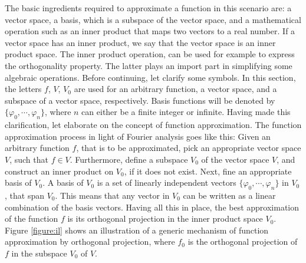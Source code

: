 \documentclass[../Main/thesis.tex]{subfiles}
\begin{document}
The basic ingredients required to approximate a function in this scenario are: a vector space, a basis, which is a subspace of the vector space, and a mathematical operation such as an inner product that maps two vectors to a real number. If a vector space has an inner product, we say that the vector space is an inner product space. The inner product operation, can be used for example to express the orthogonality property. The latter plays an import part in simplifying some algebraic operations.
\justify
Before continuing, let clarify some symbols. In this section, the letters $f$, $V$, $V_{0}$ are used for an arbitrary function, a vector space, and a subspace of a vector space, respectively.
Basis functions will be denoted by $\{  \varphi_{0}, \cdots,\varphi_{n}\}$, where $n$ can either be a finite integer or infinite. Having made this clarification, let elaborate on the concept of function approximation. 
\justify
The function approximation process in light of Fourier analysis goes like this: Given an arbitrary function $f$, that is to be approximated, pick an appropriate vector space $V$, such that $f\in V$. Furthermore, define a subspace $V_{0}$ of the vector space $V$, and construct an inner product on $V_{0}$, if it does not exist. Next, fine an appropriate basis of $V_{0}$.  A basis of $V_{0}$ is a set of linearly independent vectors   $\{  \varphi_{0}, \cdots,\varphi_{n}\}$ in $V_{0}$, that span $V_{0}$. This means that any vector in $V_{0}$ can be written as a linear combination of the basis vectors.
\justify
 Having all this in place, the best approximation of the function $f$ is its orthogonal projection in the inner product space $V_{0}$. Figure \ref{figure:il} shows an illustration of a generic mechanism of function approximation by orthogonal projection, where $f_{0}$ is the orthogonal projection of $f$ in the subspace $V_{0}$ of $V$.
\justify
\end{document}
